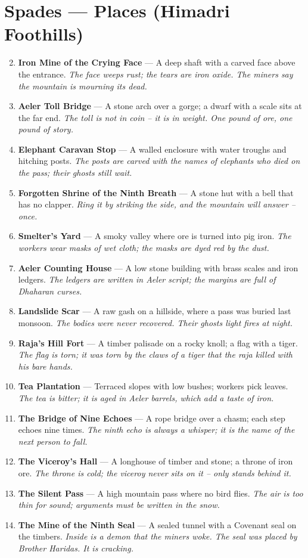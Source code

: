 \documentclass[11pt]{book}
\begin{document}
\section*{Spades — Places (Himadri Foothills)}
\begin{enumerate}
\setcounter{enumi}{1}
\item \textbf{Iron Mine of the Crying Face} — A deep shaft with a carved face above the entrance. \textit{The face weeps rust; the tears are iron oxide. The miners say the mountain is mourning its dead.}
\item \textbf{Aeler Toll Bridge} — A stone arch over a gorge; a dwarf with a scale sits at the far end. \textit{The toll is not in coin – it is in weight. One pound of ore, one pound of story.}
\item \textbf{Elephant Caravan Stop} — A walled enclosure with water troughs and hitching posts. \textit{The posts are carved with the names of elephants who died on the pass; their ghosts still wait.}
\item \textbf{Forgotten Shrine of the Ninth Breath} — A stone hut with a bell that has no clapper. \textit{Ring it by striking the side, and the mountain will answer – once.}
\item \textbf{Smelter’s Yard} — A smoky valley where ore is turned into pig iron. \textit{The workers wear masks of wet cloth; the masks are dyed red by the dust.}
\item \textbf{Aeler Counting House} — A low stone building with brass scales and iron ledgers. \textit{The ledgers are written in Aeler script; the margins are full of Dhaharan curses.}
\item \textbf{Landslide Scar} — A raw gash on a hillside, where a pass was buried last monsoon. \textit{The bodies were never recovered. Their ghosts light fires at night.}
\item \textbf{Raja’s Hill Fort} — A timber palisade on a rocky knoll; a flag with a tiger. \textit{The flag is torn; it was torn by the claws of a tiger that the raja killed with his bare hands.}
\item \textbf{Tea Plantation} — Terraced slopes with low bushes; workers pick leaves. \textit{The tea is bitter; it is aged in Aeler barrels, which add a taste of iron.}
\item[J] \textbf{The Bridge of Nine Echoes} — A rope bridge over a chasm; each step echoes nine times. \textit{The ninth echo is always a whisper; it is the name of the next person to fall.}
\item[Q] \textbf{The Viceroy’s Hall} — A longhouse of timber and stone; a throne of iron ore. \textit{The throne is cold; the viceroy never sits on it – only stands behind it.}
\item[K] \textbf{The Silent Pass} — A high mountain pass where no bird flies. \textit{The air is too thin for sound; arguments must be written in the snow.}
\item[A] \textbf{The Mine of the Ninth Seal} — A sealed tunnel with a Covenant seal on the timbers. \textit{Inside is a demon that the miners woke. The seal was placed by Brother Haridas. It is cracking.}
\end{enumerate}
\end{document}

